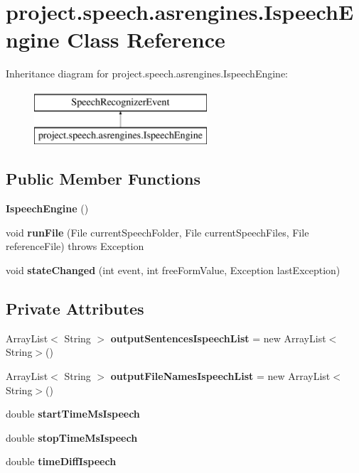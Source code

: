\section{project.\+speech.\+asrengines.\+Ispeech\+Engine Class Reference}
\label{classproject_1_1speech_1_1asrengines_1_1_ispeech_engine}
Inheritance diagram for project.\+speech.\+asrengines.\+Ispeech\+Engine\+:\begin{figure}[H]
\begin{center}
\leavevmode
\includegraphics[height=2.000000cm]{classproject_1_1speech_1_1asrengines_1_1_ispeech_engine}
\end{center}
\end{figure}
\subsection*{Public Member Functions}
\begin{DoxyCompactItemize}
\item 
{\bf Ispeech\+Engine} ()
\item 
void {\bf run\+File} (File current\+Speech\+Folder, File current\+Speech\+Files, File reference\+File)  throws Exception 
\item 
void {\bf state\+Changed} (int event, int free\+Form\+Value, Exception last\+Exception)
\end{DoxyCompactItemize}
\subsection*{Private Attributes}
\begin{DoxyCompactItemize}
\item 
Array\+List$<$ String $>$ {\bf output\+Sentences\+Ispeech\+List} = new Array\+List$<$String$>$()
\item 
Array\+List$<$ String $>$ {\bf output\+File\+Names\+Ispeech\+List} = new Array\+List$<$String$>$()
\item 
double {\bf start\+Time\+Ms\+Ispeech}
\item 
double {\bf stop\+Time\+Ms\+Ispeech}
\item 
double {\bf time\+Diff\+Ispeech}
\end{DoxyCompactItemize}
